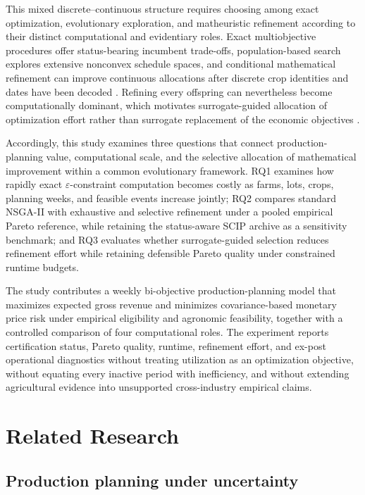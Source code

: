 \documentclass[]{interact}
\begin{document}
This mixed discrete--continuous structure requires choosing among exact optimization, evolutionary exploration, and matheuristic refinement according to their distinct computational and evidentiary roles. Exact multiobjective procedures offer status-bearing incumbent trade-offs, population-based search explores extensive nonconvex schedule spaces, and conditional mathematical refinement can improve continuous allocations after discrete crop identities and dates have been decoded \citep{Mavrotas2009,Deb2002,Hu2024}. Refining every offspring can nevertheless become computationally dominant, which motivates surrogate-guided allocation of optimization effort rather than surrogate replacement of the economic objectives \citep{Jin2011,Liu2024}.

Accordingly, this study examines three questions that connect production-planning value, computational scale, and the selective allocation of mathematical improvement within a common evolutionary framework. RQ1 examines how rapidly exact $\varepsilon$-constraint computation becomes costly as farms, lots, crops, planning weeks, and feasible events increase jointly; RQ2 compares standard NSGA-II with exhaustive and selective refinement under a pooled empirical Pareto reference, while retaining the status-aware SCIP archive as a sensitivity benchmark; and RQ3 evaluates whether surrogate-guided selection reduces refinement effort while retaining defensible Pareto quality under constrained runtime budgets.

The study contributes a weekly bi-objective production-planning model that maximizes expected gross revenue and minimizes covariance-based monetary price risk under empirical eligibility and agronomic feasibility, together with a controlled comparison of four computational roles. The experiment reports certification status, Pareto quality, runtime, refinement effort, and ex-post operational diagnostics without treating utilization as an optimization objective, without equating every inactive period with inefficiency, and without extending agricultural evidence into unsupported cross-industry empirical claims.

\section{Related Research}

\subsection{Production planning under uncertainty}
\end{document}
